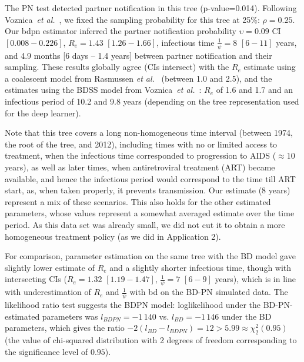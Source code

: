 \documentclass[10pt,letterpaper]{article}
\begin{document}
The PN test detected partner notification in this tree (p-value=0.014). Following Voznica~\textit{et al.}~\cite{Voznica2021}, we fixed the sampling probability for this tree at 25\%: $\rho=0.25$. Our bdpn estimator inferred the partner notification probability $\upsilon=0.09$ CI $[0.008-0.226]$,  
$R_e = 1.43$ $[1.26-1.66]$, infectious time $\frac{1}{\psi} = 8$ $[6-11]$ years, and 4.9 months [6 days -- 1.4 years] between partner notification and their sampling. These results globally agree (CIs intersect) with the $R_e$ estimate using a coalescent model from Rasmussen \textit{et al.}~\cite{Rasmussen2017} (between 1.0 and 2.5), and the estimates using the BDSS model from Voznica~\textit{et al.}~\cite{Voznica2021}: $R_e$ of 1.6 and 1.7 and an infectious period of 10.2 and 9.8 years (depending on the tree representation used for the deep learner).

Note that this tree covers a long non-homogeneous time interval (between 1974, the root of the tree, and 2012), including times with no or limited access to treatment, when the infectious time corresponded to progression to AIDS ($\approx 10$ years), as well as later times, when antiretroviral treatment (ART) became available, and hence the infectious period would correspond to the time till ART start, as, when taken properly, it prevents transmission. Our estimate (8 years) represent a mix of these scenarios. This also holds for the other estimated parameters, whose values represent a somewhat averaged estimate over the time period. As this data set was already small, we did not cut it to obtain a more homogeneous treatment policy (as we did in Application 2).


For comparison, parameter estimation on the same tree with the BD model gave slightly lower estimate of $R_e$ and a slightly shorter infectious time, though with intersecting CIs ($R_e = 1.32$ $[1.19-1.47]$, $\frac{1}{\psi} = 7$ $[6-9]$ years), which is in line with underestimation of $R_e$ and $\frac{1}{\psi}$ with bd on the BD-PN simulated data. The likelihood ratio test suggests the BDPN model: loglikelihood under the BD-PN-estimated parameters was $l_{BDPN} = -1\,140$ vs. $l_{BD}=-1\,146$ under the BD parameters, which gives the ratio $-2 (l_{BD} - l_{BDPN}) =	12 > 5.99 \approx \chi^2_2(0.95)$ (the value of chi-squared distribution with 2 degrees of freedom corresponding to the significance level of $0.95$). %
\end{document}
